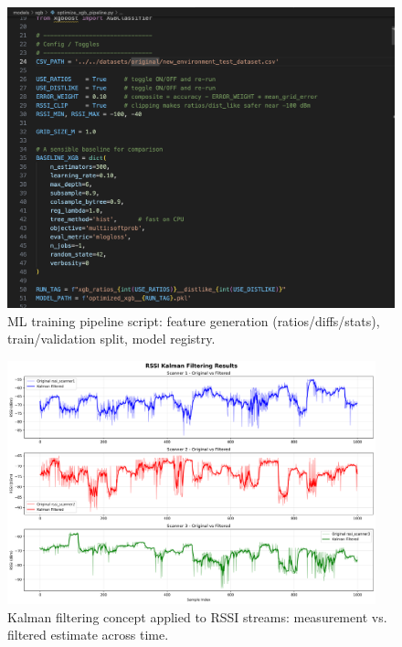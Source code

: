 \documentclass[a4paper,12pt]{report}
\begin{document}
\begin{figure}[H]
    \centering
    \includegraphics[width=\textwidth]{figures/ml_pipeline_code.png}
    \caption{ML training pipeline script: feature generation (ratios/diffs/stats), train/validation split, model registry.}
    \label{fig:ml_pipeline_code}
\end{figure}

\begin{figure}[H]
    \centering
    \includegraphics[width=0.95\textwidth]{figures/kalman_concept.png}
    \caption{Kalman filtering concept applied to RSSI streams: measurement vs. filtered estimate across time.}
    \label{fig:kalman_concept}
\end{figure}
\end{document}
